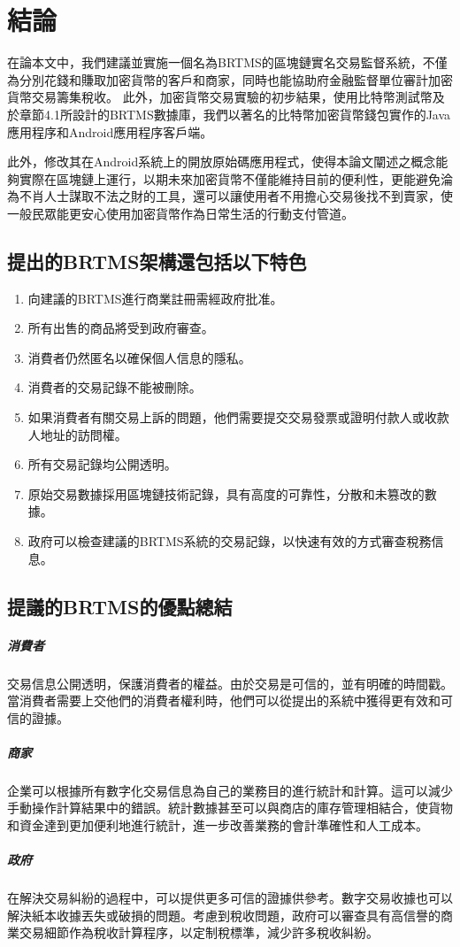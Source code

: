 
\chapter{結論}
在論本文中，我們建議並實施一個名為BRTMS的區塊鏈實名交易監督系統，不僅為分別花錢和賺取加密貨幣的客戶和商家，同時也能協助府金融監督單位審計加密貨幣交易籌集稅收。 此外，加密貨幣交易實驗的初步結果，使用比特幣測試幣及於章節4.1所設計的BRTMS數據庫，我們以著名的比特幣加密貨幣錢包實作的Java應用程序和Android應用程序客戶端。
	
此外，修改其在Android系統上的開放原始碼應用程式，使得本論文闡述之概念能夠實際在區塊鏈上運行，以期未來加密貨幣不僅能維持目前的便利性，更能避免淪為不肖⼈⼠謀取不法之財的工具，還可以讓使用者不用擔心交易後找不到賣家，使一般民眾能更安心使用加密貨幣作為日常生活的行動支付管道。

	\section{提出的BRTMS架構還包括以下特色}

		\begin{enumerate}
			\item 向建議的BRTMS進行商業註冊需經政府批准。
			\item 所有出售的商品將受到政府審查。
			\item 消費者仍然匿名以確保個人信息的隱私。
			\item 消費者的交易記錄不能被刪除。
			\item 如果消費者有關交易上訴的問題，他們需要提交交易發票或證明付款人或收款人地址的訪問權。
			\item 所有交易記錄均公開透明。
			\item 原始交易數據採用區塊鏈技術記錄，具有高度的可靠性，分散和未篡改的數據。
			\item 政府可以檢查建議的BRTMS系統的交易記錄，以快速有效的方式審查稅務信息。
		\end{enumerate}

	\section{提議的BRTMS的優點總結}

		\paragraph{消費者}交易信息公開透明，保護消費者的權益。由於交易是可信的，並有明確的時間戳。當消費者需要上交他們的消費者權利時，他們可以從提出的系統中獲得更有效和可信的證據。
		\paragraph{商家}企業可以根據所有數字化交易信息為自己的業務目的進行統計和計算。這可以減少手動操作計算結果中的錯誤。統計數據甚至可以與商店的庫存管理相結合，使貨物和資金達到更加便利地進行統計，進一步改善業務的會計準確性和人工成本。
		\paragraph{政府}在解決交易糾紛的過程中，可以提供更多可信的證據供參考。數字交易收據也可以解決紙本收據丟失或破損的問題。考慮到稅收問題，政府可以審查具有高信譽的商業交易細節作為稅收計算程序，以定制稅標準，減少許多稅收糾紛。
